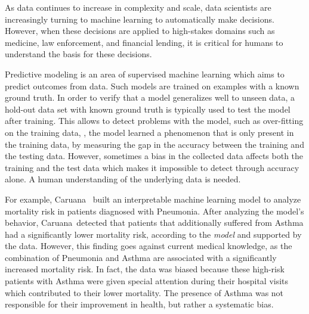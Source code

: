 As data continues to increase in complexity and scale, data scientists are increasingly turning to machine learning to automatically make decisions.  However, when these decisions are applied to high-stakes domains such as medicine, law enforcement, and financial lending, it is critical for humans to understand the basis for these decisions.


Predictive modeling is an area of supervised machine learning which aims to predict outcomes from data.
Such models are trained on examples with a known ground truth.  In order to verify that a model generalizes well to unseen data, a hold-out data set with known ground truth is typically used to test the model after training.
This allows to detect problems with the model, such as over-fitting on the training data, \ie, the model learned a phenomenon that is only present in the training data, by measuring the gap in the accuracy between the training and the testing data.
However, sometimes a bias in the collected data affects both the training and the test data which makes it impossible to detect through accuracy alone.
A human understanding of the underlying data is needed.

For example, Caruana~\etal\cite{Caruana:2015:IMH:2783258.2788613} built an interpretable machine learning model to analyze mortality risk in patients diagnosed with Pneumonia.
After analyzing the model's behavior, Caruana~\etal detected that patients that additionally suffered from Asthma had a significantly lower mortality risk, according to the \emph{model} and supported by the data.
However, this finding goes against current medical knowledge, as the combination of Pneumonia and Asthma are associated with a significantly increased mortality risk.
In fact, the data was biased because these high-risk patients with Asthma were given special attention during their hospital visits which contributed to their lower mortality.  The presence of Asthma was not responsible for their improvement in health, but rather a systematic bias. 

